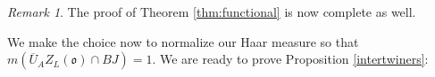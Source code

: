 \documentclass[11pt,letterpaper]{article}
\newcommand{\calB}{\mathcal{B}}
\newcommand{\ve}{\varepsilon}
\newcommand{\goth}{\mathfrak}
\newcommand{\GSO}{\textup{GSO}}
\theoremstyle{remark}
\newtheorem*{remark}{Remark}
\numberwithin{equation}{section}
\begin{document}
\begin{remark}
The proof of Theorem \ref{thm:functional} is now complete as well.
\end{remark}

We make the choice now to normalize our Haar measure so that $m(\overline{U}_AZ_L(\goth{o}) \cap BJ) = 1$. We are ready to prove Proposition \eqref{intertwiners}:




\end{document}
